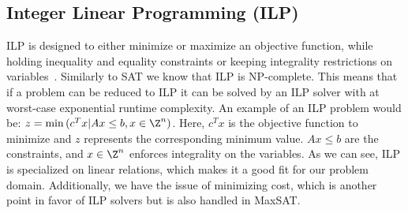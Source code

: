 \subsection{Integer Linear Programming (ILP)}
\Ac{ILP} is designed to either minimize or maximize an objective function, while holding inequality and equality constraints or keeping integrality restrictions on variables~\cite{bib:1994-chaudhuri}. Similarly to \ac{SAT} we know that \ac{ILP} is NP-complete. This means that if a problem can be reduced to \ac{ILP} it can be solved by an \ac{ILP} solver with at worst-case exponential runtime complexity. An example of an \ac{ILP} problem would be: $z = \min{(c^Tx | Ax \leq b, x \in \Z^n)}$. Here, $c^Tx$ is the objective function to minimize and $z$ represents the corresponding minimum value. $Ax \leq b$ are the constraints, and $x \in \Z^n$ enforces integrality on the variables. As we can see, \ac{ILP} is specialized on linear relations, which makes it a good fit for our problem domain. Additionally, we have the issue of minimizing cost, which is another point in favor of \ac{ILP} solvers but is also handled in \ac{MaxSAT}.

